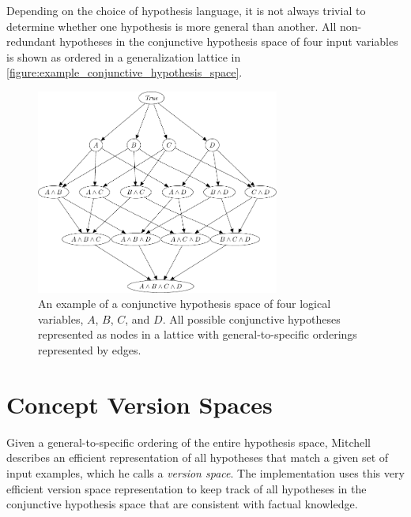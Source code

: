 Depending on the choice of hypothesis language, it is not always
trivial to determine whether one hypothesis is more general than
another.  All non-redundant hypotheses in the conjunctive hypothesis
space of four input variables is shown as ordered in a generalization
lattice in
{\mbox{\autoref{figure:example_conjunctive_hypothesis_space}}}.
\begin{figure}
\center
\includegraphics[width=8cm]{gfx/example_conjunctive_hypothesis_space}
\caption[An example of a conjunctive hypothesis space.]{An example of
  a conjunctive hypothesis space of four logical variables, $A$, $B$,
  $C$, and $D$.  All possible conjunctive hypotheses represented as
  nodes in a lattice with general-to-specific orderings represented by
  edges.}
\label{figure:example_conjunctive_hypothesis_space}
\end{figure}

\section{Concept Version Spaces}

Given a general-to-specific ordering of the entire hypothesis space,
Mitchell describes an efficient representation of all hypotheses that
match a given set of input examples, which he calls a \emph{version
  space}.  The implementation uses this very efficient version space
representation to keep track of all hypotheses in the conjunctive
hypothesis space that are consistent with factual knowledge.


